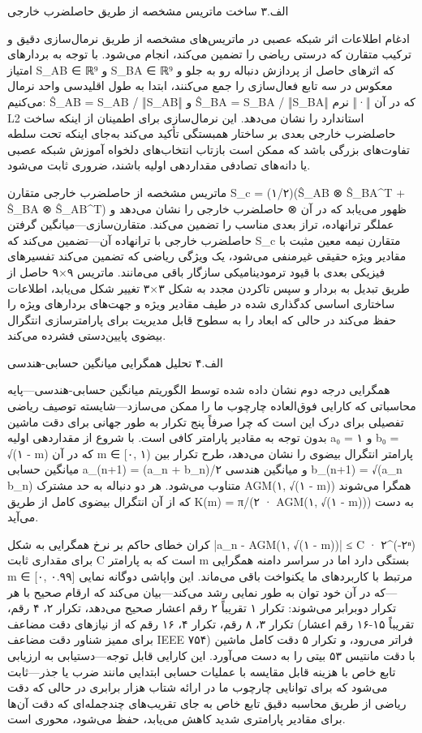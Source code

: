 \documentclass[12pt, a4paper]{article}
\begin{document}
الف.۳ ساخت ماتریس مشخصه از طریق حاصلضرب خارجی

ادغام اطلاعات اثر شبکه عصبی در ماتریس‌های مشخصه از طریق نرمال‌سازی دقیق و ترکیب متقارن که درستی ریاضی را تضمین می‌کند، انجام می‌شود. با توجه به بردارهای امتیاز S\_AB ∈ ℝ⁹ و S\_BA ∈ ℝ⁹ که اثرهای حاصل از پردازش دنباله رو به جلو و معکوس در سه تابع فعال‌سازی را جمع می‌کنند، ابتدا به طول اقلیدسی واحد نرمال می‌کنیم: Ŝ\_AB = S\_AB / ‖S\_AB‖ و Ŝ\_BA = S\_BA / ‖S\_BA‖ که در آن ‖·‖ نرم L2 استاندارد را نشان می‌دهد. این نرمال‌سازی برای اطمینان از اینکه ساخت حاصلضرب خارجی بعدی بر ساختار همبستگی تأکید می‌کند به‌جای اینکه تحت سلطه تفاوت‌های بزرگی باشد که ممکن است بازتاب انتخاب‌های دلخواه آموزش شبکه عصبی یا دانه‌های تصادفی مقداردهی اولیه باشند، ضروری ثابت می‌شود.

ماتریس مشخصه از حاصلضرب خارجی متقارن S\_c = (۱/۲)(Ŝ\_AB ⊗ Ŝ\_BA\textasciicircum{}T + Ŝ\_BA ⊗ Ŝ\_AB\textasciicircum{}T) ظهور می‌یابد که در آن ⊗ حاصلضرب خارجی را نشان می‌دهد و عملگر ترانهاده، تراز بعدی مناسب را تضمین می‌کند. متقارن‌سازی—میانگین گرفتن حاصلضرب خارجی با ترانهاده آن—تضمین می‌کند که S\_c متقارن نیمه معین مثبت با مقادیر ویژه حقیقی غیرمنفی می‌شود، یک ویژگی ریاضی که تضمین می‌کند تفسیرهای فیزیکی بعدی با قیود ترمودینامیکی سازگار باقی می‌مانند. ماتریس ۹×۹ حاصل از طریق تبدیل به بردار و سپس تاکردن مجدد به شکل ۳×۳ تغییر شکل می‌یابد، اطلاعات ساختاری اساسی کدگذاری شده در طیف مقادیر ویژه و جهت‌های بردارهای ویژه را حفظ می‌کند در حالی که ابعاد را به سطوح قابل مدیریت برای پارامترسازی انتگرال بیضوی پایین‌دستی فشرده می‌کند.

الف.۴ تحلیل همگرایی میانگین حسابی-هندسی

همگرایی درجه دوم نشان داده شده توسط الگوریتم میانگین حسابی-هندسی—پایه محاسباتی که کارایی فوق‌العاده چارچوب ما را ممکن می‌سازد—شایسته توصیف ریاضی تفصیلی برای درک این است که چرا صرفاً پنج تکرار به طور جهانی برای دقت ماشین بدون توجه به مقادیر پارامتر کافی است. با شروع از مقداردهی اولیه a₀ = ۱ و b₀ = √(۱ - m) که در آن m ∈ [۰, ۱) پارامتر انتگرال بیضوی را نشان می‌دهد، طرح تکرار بین میانگین حسابی a\_(n+1) = (a\_n + b\_n)/۲ و میانگین هندسی b\_(n+1) = √(a\_n b\_n) متناوب می‌شود. هر دو دنباله به حد مشترک AGM(۱, √(۱ - m)) همگرا می‌شوند که از آن انتگرال بیضوی کامل از طریق K(m) = π/(۲ · AGM(۱, √(۱ - m))) به دست می‌آید.

کران خطای حاکم بر نرخ همگرایی به شکل |a\_n - AGM(۱, √(۱ - m))| ≤ C · ۲\textasciicircum{}(-۲ⁿ) برای مقداری ثابت C است که به پارامتر m بستگی دارد اما در سراسر دامنه همگرایی m ∈ [۰, ۰.۹۹] مرتبط با کاربردهای ما یکنواخت باقی می‌ماند. این واپاشی دوگانه نمایی—که در آن خود توان به طور نمایی رشد می‌کند—بیان می‌کند که ارقام صحیح با هر تکرار دوبرابر می‌شوند: تکرار ۱ تقریباً ۲ رقم اعشار صحیح می‌دهد، تکرار ۲، ۴ رقم، تکرار ۳، ۸ رقم، تکرار ۴، ۱۶ رقم که از نیازهای دقت مضاعف (تقریباً ۱۵-۱۶ رقم اعشار برای ممیز شناور دقت مضاعف IEEE ۷۵۴) فراتر می‌رود، و تکرار ۵ دقت کامل ماشین با دقت مانتیس ۵۳ بیتی را به دست می‌آورد. این کارایی قابل توجه—دستیابی به ارزیابی تابع خاص با هزینه قابل مقایسه با عملیات حسابی ابتدایی مانند ضرب یا جذر—ثابت می‌شود که برای توانایی چارچوب ما در ارائه شتاب هزار برابری در حالی که دقت ریاضی از طریق محاسبه دقیق تابع خاص به جای تقریب‌های چندجمله‌ای که دقت آن‌ها برای مقادیر پارامتری شدید کاهش می‌یابد، حفظ می‌شود، محوری است.
\end{document}
